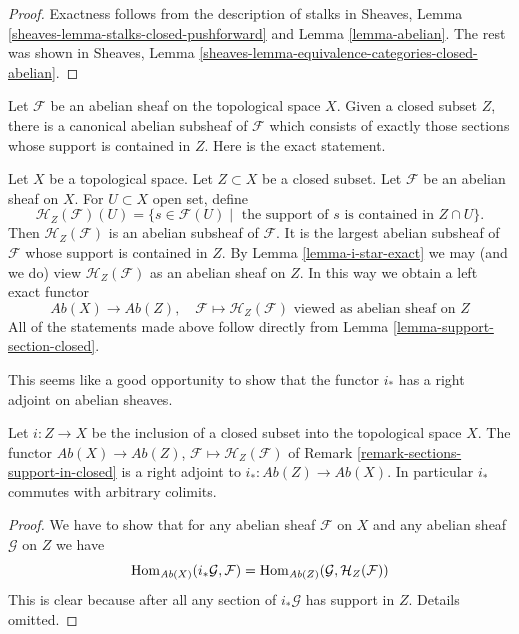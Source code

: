 \begin{proof}
Exactness follows from the description of
stalks in Sheaves, Lemma \ref{sheaves-lemma-stalks-closed-pushforward}
and Lemma \ref{lemma-abelian}. The rest was shown in
Sheaves, Lemma \ref{sheaves-lemma-equivalence-categories-closed-abelian}.
\end{proof}

\noindent
Let $\mathcal{F}$ be an abelian sheaf on the topological space $X$. Given
a closed subset $Z$, there is a canonical abelian subsheaf of $\mathcal{F}$
which consists of exactly those sections whose support is contained in $Z$.
Here is the exact statement.

\begin{remark}
\label{remark-sections-support-in-closed}
Let $X$ be a topological space. Let $Z \subset X$ be a closed subset.
Let $\mathcal{F}$ be an abelian sheaf on $X$. For $U \subset X$ open set, define
$$
\mathcal{H}_Z(\mathcal{F})(U) =
\{s \in \mathcal{F}(U) \mid
\text{ the support of }s\text{ is contained in }Z \cap U\}.
$$
Then $\mathcal{H}_Z(\mathcal{F})$ is an abelian subsheaf of $\mathcal{F}$.
It is the largest abelian subsheaf of $\mathcal{F}$ whose support is
contained in $Z$. By Lemma \ref{lemma-i-star-exact} we may (and we do)
view $\mathcal{H}_Z(\mathcal{F})$ as an abelian sheaf on $Z$.
In this way we obtain a left exact functor
$$
\textit{Ab}(X) \longrightarrow \textit{Ab}(Z),\quad
\mathcal{F} \longmapsto \mathcal{H}_Z(\mathcal{F})
\text{ viewed as abelian sheaf on }Z
$$
All of the statements made above follow directly from
Lemma \ref{lemma-support-section-closed}.
\end{remark}

\noindent
This seems like a good opportunity to show that the functor
$i_*$ has a right adjoint on abelian sheaves.

\begin{lemma}
\label{lemma-i-star-right-adjoint}
Let $i : Z \to X$ be the inclusion of a closed subset into the
topological space $X$. The functor $\textit{Ab}(X) \to \textit{Ab}(Z)$,
$\mathcal{F} \mapsto \mathcal{H}_Z(\mathcal{F})$ of
Remark \ref{remark-sections-support-in-closed}
is a right adjoint to $i_* : \textit{Ab}(Z) \to \textit{Ab}(X)$.
In particular $i_*$ commutes with arbitrary colimits.
\end{lemma}

\begin{proof}
We have to show that for any abelian sheaf $\mathcal{F}$ on $X$ and any
abelian sheaf $\mathcal{G}$ on $Z$ we have
$$
\mathop{\mathrm{Hom}}\nolimits_{\textit{Ab}(X)}(i_*\mathcal{G}, \mathcal{F}) =
\mathop{\mathrm{Hom}}\nolimits_{\textit{Ab}(Z)}(\mathcal{G}, \mathcal{H}_Z(\mathcal{F}))
$$
This is clear because after all any section of $i_*\mathcal{G}$
has support in $Z$. Details omitted.
\end{proof}

